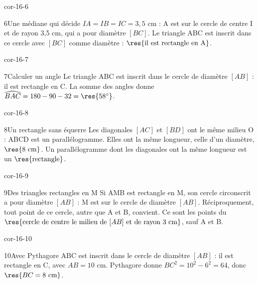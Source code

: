 \begin{blocLivre}{cor-16-6}\begin{corrige}{6}{Une médiane qui décide}
$IA=IB=IC=3{,}5$ cm : A est sur le cercle de centre I et de rayon 3,5 cm, qui a pour diamètre $[BC]$. Le triangle ABC est inscrit dans ce cercle avec $[BC]$ comme diamètre : $\res{\text{il est rectangle en A}}$.
\label{fig-cor-16-6}
\end{corrige}\end{blocLivre}
\begin{blocLivre}{cor-16-7}\begin{corrige}{7}{Calculer un angle}
Le triangle ABC est inscrit dans le cercle de diamètre $[AB]$ : il est rectangle en C. La somme des angles donne $\widehat{BAC}=180-90-32=\res{58^\circ}$.
\label{fig-cor-16-7}
\end{corrige}\end{blocLivre}
\begin{blocLivre}{cor-16-8}\begin{corrige}{8}{Un rectangle sans équerre}
Les diagonales $[AC]$ et $[BD]$ ont le même milieu O : ABCD est un parallélogramme. Elles ont la même longueur, celle d’un diamètre, $\res{8\ \mathrm{cm}}$. Un parallélogramme dont les diagonales ont la même longueur est un $\res{\text{rectangle}}$.
\label{fig-cor-16-8}
\end{corrige}\end{blocLivre}
\begin{blocLivre}{cor-16-9}\begin{corrige}{9}{Des triangles rectangles en M}
Si AMB est rectangle en M, son cercle circonscrit a pour diamètre $[AB]$ : M est sur le cercle de diamètre $[AB]$. Réciproquement, tout point de ce cercle, autre que A et B, convient. Ce sont les points du $\res{\text{cercle de centre le milieu de }[AB]\text{ et de rayon 3 cm}}$, sauf A et B.
\label{fig-cor-16-9}
\end{corrige}\end{blocLivre}
\begin{blocLivre}{cor-16-10}\begin{corrige}{10}{Avec Pythagore}
ABC est inscrit dans le cercle de diamètre $[AB]$ : il est rectangle en C, avec $AB=10$ cm. Pythagore donne $BC^2=10^2-6^2=64$, donc $\res{BC=8\ \mathrm{cm}}$.
\label{fig-cor-16-10}
\end{corrige}\end{blocLivre}
